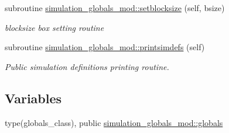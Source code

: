 \begin{DoxyCompactItemize}
subroutine \mbox{\hyperlink{namespacesimulation__globals__mod_aa65b43534d2d2b6366a4ebc791194805}{simulation\+\_\+globals\+\_\+mod\+::setblocksize}} (self, bsize)
\begin{DoxyCompactList}\small\item\em blocksize box setting routine \end{DoxyCompactList}\item 
subroutine \mbox{\hyperlink{namespacesimulation__globals__mod_ad331ccf019de7ed531e37c655600f90f}{simulation\+\_\+globals\+\_\+mod\+::printsimdefs}} (self)
\begin{DoxyCompactList}\small\item\em Public simulation definitions printing routine. \end{DoxyCompactList}\end{DoxyCompactItemize}
\subsection*{Variables}
\begin{DoxyCompactItemize}
\item 
type(globals\+\_\+class), public \mbox{\hyperlink{namespacesimulation__globals__mod_a04123075b6de525703edb89697fc39e9}{simulation\+\_\+globals\+\_\+mod\+::globals}}
\end{DoxyCompactItemize}
